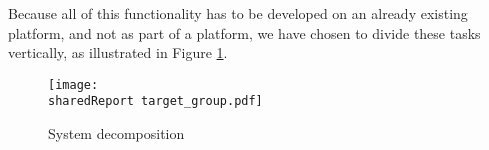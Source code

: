 Because all of this functionality has to be developed on an already existing platform, and not as part of a platform, we have chosen to divide these tasks vertically, as illustrated in Figure \ref{fig:target_group}.


\begin{figure}
	\centering
		\texttt{[image: \\sharedReport target\_group.pdf]}
	\caption{System decomposition}
	\label{fig:target_group}
\end{figure}
